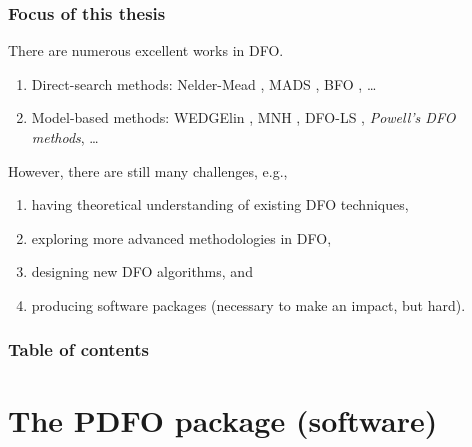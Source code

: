 \documentclass{polyu-presentation}
\begin{document}
\begin{frame}
    \frametitle{Focus of this thesis}

    There are numerous excellent works in DFO.

    \medskip

    \begin{block}{}
        \begin{enumerate}
            \item \alert{Direct-search methods}: Nelder-Mead \parencite{Nelder_Mead_1965}, MADS \parencite{Audet_Dennis_2006}, BFO \parencite{Porcelli_Toint_2017,Porcelli_Toint_2022}, \dots
            \item \alert{Model-based methods}: WEDGElin \parencite{Marazzi_Nocedal_2002}, MNH \parencite{Wild_2008}, DFO-LS \parencite{Cartis_Etal_2019,Hough_Roberts_2022}, \emph{Powell's DFO methods}, \dots
        \end{enumerate}
    \end{block}

    \medskip

    However, there are still many challenges, e.g.,
    \begin{enumerate}
        \item having \alert{theoretical} understanding of existing DFO techniques,
        \item exploring more advanced \alert{methodologies} in DFO,
        \item designing new DFO \alert{algorithms}, and
        \item producing \alert{software} packages (necessary to make an \alert{impact}, but \alert{hard}).
    \end{enumerate}
\end{frame}

\begin{framenopagination}
    \frametitle{Table of contents}
    
	\tableofcontents[hideallsubsections]
\end{framenopagination}

\section{The PDFO package (\textbf{software})}
\end{document}
